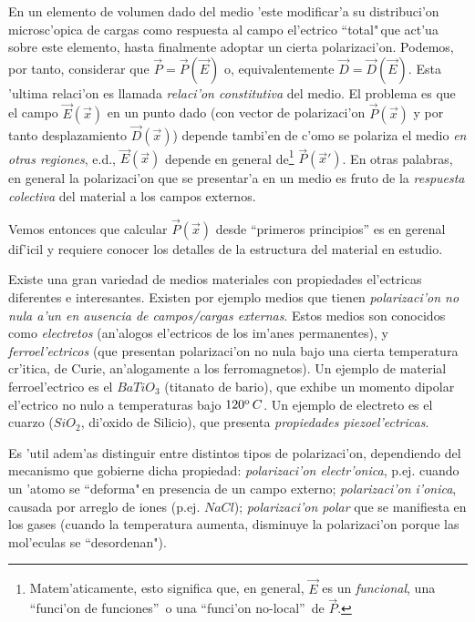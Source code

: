 En un elemento de volumen dado del medio 'este modificar'a su distribuci'on microsc'opica de cargas como respuesta al campo el'ectrico ``total"\,que act'ua sobre este elemento, hasta finalmente adoptar un cierta polarizaci'on. Podemos, por tanto, considerar que $\vec{P}=\vec{P}(\vec{E})$ o, equivalentemente
$\vec{D}=\vec{D}(\vec{E})$. Esta 'ultima relaci'on es llamada
\textit{relaci'on constitutiva} del medio. El problema es que el campo
$\vec{E}(\vec{x})$ en un punto dado (con vector de polarizaci'on $\vec{P}(\vec{x})$ y
por tanto desplazamiento $\vec{D}(\vec{x})$) depende tambi'en de c'omo se
polariza el medio \textit{en otras regiones}, e.d., $\vec{E}(\vec{x})$ depende
en general de\footnote{Matem'aticamente, esto significa que, en
general, $\vec{E}$ es un \textit{funcional}, una ``funci'on de funciones''\, o
una ``funci'on no-local''\, de $\vec{P}$.} $\vec{P}(\vec{x}')$.
En otras palabras, en general la polarizaci'on que se presentar'a en un medio es fruto de la  \textit{respuesta colectiva} del material a los campos externos.

 Vemos entonces que calcular $\vec{P}(\vec{x})$ desde ``primeros principios'' es en gerenal dif'icil y requiere conocer los detalles de la estructura del material en estudio.

Existe una gran variedad de medios materiales con propiedades el'ectricas
diferentes e interesantes. Existen por ejemplo medios que tienen \textit{polarizaci'on
no nula a'un en ausencia de campos/cargas externas}. Estos medios son conocidos
como \textit{electretos} (an'alogos el'ectricos de los im'anes permanentes), y 
\textit{ferroel'ectricos} (que presentan polarizaci'on no nula bajo una cierta
temperatura cr'itica, de Curie, an'alogamente a los ferromagnetos). Un ejemplo
de material ferroel'ectrico es el $BaTiO_3$ (titanato de bario), que exhibe un
momento dipolar el'ectrico no nulo a temperaturas bajo $120^{\rm o}\,C$. Un ejemplo de electreto es el cuarzo ($SiO_2$, di'oxido de Silicio), que presenta \textit{propiedades piezoel'ectricas}.

Es 'util adem'as distinguir entre distintos tipos de polarizaci'on, dependiendo del mecanismo que gobierne dicha propiedad: \textit{polarizaci'on electr'onica}, p.ej. cuando un 'atomo se ``deforma"\,en presencia de un campo externo; \textit{polarizaci'on i'onica}, causada por arreglo de iones (p.ej. $NaCl$); \textit{polarizaci'on polar} que se manifiesta en los gases (cuando la
temperatura aumenta, disminuye la polarizaci'on porque las mol'eculas se
``desordenan").

